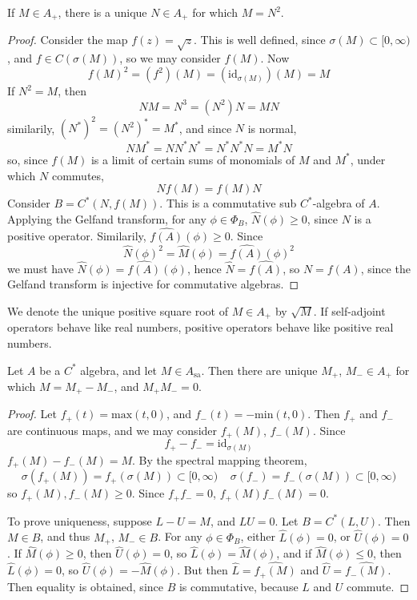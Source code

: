 \begin{prop}
    If $M \in A_+$, there is a unique $N \in A_+$ for which $M = N^2$.
\end{prop}
\begin{proof}
    Consider the map $f(z) = \sqrt{z}$. This is well defined, since $\sigma(M) \subset [0,\infty)$, and $f \in C(\sigma(M))$, so we may consider $f(M)$. Now
    \[ f(M)^2 = (f^2)(M) = (\text{id}_{\sigma(M)})(M) = M \]
    If $N^2 = M$, then
    \[ NM = N^3 = (N^2)N = MN \]
    similarily, $(N^*)^2 = (N^2)^* = M^*$, and since $N$ is normal,
    \[ NM^* = NN^*N^* = N^*N^*N = M^*N \]
    so, since $f(M)$ is a limit of certain sums of monomials of $M$ and $M^*$, under which $N$ commutes,
    \[ Nf(M) = f(M)N \]
    Consider $B = C^*(N, f(M))$. This is a commutative sub $C^*$-algebra of $A$. Applying the Gelfand transform, for any $\phi \in \Phi_B$, $\widehat{N}(\phi) \geq 0$, since $N$ is a positive operator. Similarily, $\widehat{f(A)}(\phi) \geq 0$. Since
    \[ \widehat{N}(\phi)^2 = \widehat{M}(\phi) = \widehat{f(A)}(\phi)^2 \]
    we must have $\widehat{N}(\phi) = \widehat{f(A)}(\phi)$, hence $\widehat{N} = \widehat{f(A)}$, so $N = f(A)$, since the Gelfand transform is injective for commutative algebras.
\end{proof}

We denote the unique positive square root of $M \in A_+$ by $\sqrt{M}$. If self-adjoint operators behave like real numbers, positive operators behave like positive real numbers.

\begin{prop}
    Let $A$ be a $C^*$ algebra, and let $M \in A_{\text{sa}}$. Then there are unique $M_+$, $M_- \in A_+$ for which $M = M_+ - M_-$, and $M_+ M_- = 0$.
\end{prop}
\begin{proof}
    Let $f_+(t) = \text{max}(t,0)$, and $f_-(t) = -\text{min}(t,0)$. Then $f_+$ and $f_-$ are continuous maps, and we may consider $f_+(M)$, $f_-(M)$. Since
    \[ f_+ - f_- = \text{id}_{\sigma(M)} \]
    $f_+(M) - f_-(M) = M$. By the spectral mapping theorem,
    \[ \sigma(f_+(M)) = f_+(\sigma(M)) \subset [0,\infty)\ \ \ \ \ \sigma(f_-) = f_-(\sigma(M)) \subset [0,\infty) \]
    so $f_+(M), f_-(M) \geq 0$. Since $f_+ f_- = 0$, $f_+(M) f_-(M) = 0$.

    To prove uniqueness, suppose $L - U = M$, and $LU = 0$. Let $B = C^*(L,U)$. Then $M \in B$, and thus $M_+$, $M_- \in B$. For any $\phi \in \Phi_B$, either $\widehat{L}(\phi) = 0$, or $\widehat{U}(\phi) = 0$. If $\widehat{M}(\phi) \geq 0$, then $\widehat{U}(\phi) = 0$, so $\widehat{L}(\phi) = \widehat{M}(\phi)$, and if $\widehat{M}(\phi) \leq 0$, then $\widehat{L}(\phi) = 0$, so $\widehat{U}(\phi) = -\widehat{M}(\phi)$. But then $\widehat{L} = \widehat{f_+(M)}$ and $\widehat{U} = \widehat{f_-(M)}$. Then equality is obtained, since $B$ is commutative, because $L$ and $U$ commute.
\end{proof}

